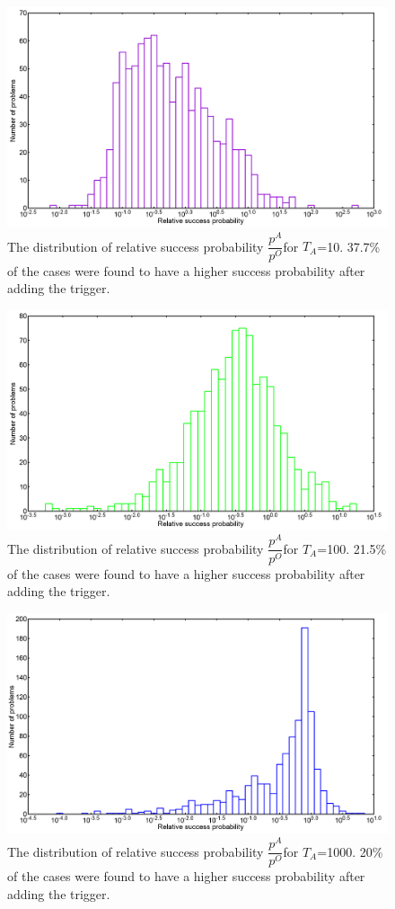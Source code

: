 \documentclass[../main.tex]{subfiles}
\begin{document}
\begin{figure}[H]
\centering 
\includegraphics[scale=0.3]{A_T10_g1.png}
\caption{The distribution of relative success probability $\dfrac{p^A}{p^O}$for $T_A$=10. 37.7\% of the cases were found to have a higher success probability after adding the trigger.}
\label{fig:a18}
\end{figure}
\begin{figure}[H]
\centering 
\includegraphics[scale=0.3]{A_T100_g1.png}
\caption{The distribution of relative success probability $\dfrac{p^A}{p^O}$for $T_A$=100. 21.5\% of the cases were found to have a higher success probability after adding the trigger. }
\label{fig:a19}
\end{figure}
\begin{figure}[H]
\centering 
\includegraphics[scale=0.3]{A_T1000_g1.png}
\caption{The distribution of relative success probability $\dfrac{p^A}{p^O}$for $T_A$=1000. 20\% of the cases were found to have a higher success probability after adding the trigger.}
\label{fig:a20}
\end{figure}
\end{document}
